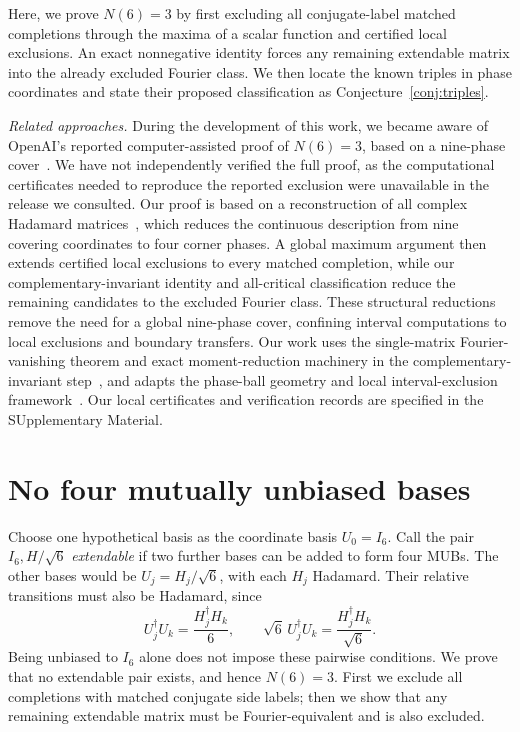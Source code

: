 Here, we prove $N(6)=3$ by first excluding all conjugate-label matched completions through the maxima of a scalar function and certified local exclusions. An exact nonnegative identity forces any remaining extendable matrix into the already excluded Fourier class. We then locate the known triples in phase coordinates and state their proposed classification as Conjecture~\ref{conj:triples}. 

\noindent\emph{Related approaches.}
During the development of this work, we became aware of OpenAI's reported computer-assisted proof of $N(6)=3$, based on a nine-phase cover~\cite{OAIMUB2026}. We have not independently verified the full proof, as the computational certificates needed to reproduce the reported exclusion were unavailable in the release we consulted. 
Our proof is based on a reconstruction of all complex Hadamard matrices~\cite{wuttig2026completeclassificationcomplexhadamard}, which reduces the continuous description from nine covering coordinates to four corner phases. A global maximum argument then extends certified local exclusions to every matched completion, while our complementary-invariant identity and all-critical classification reduce the remaining candidates to the excluded Fourier class. These structural reductions remove the need for a global nine-phase cover, confining interval computations to local exclusions and boundary transfers. Our work uses the single-matrix Fourier-vanishing theorem and exact moment-reduction machinery in the complementary-invariant step~\cite{OAIFourier2026}, and adapts the phase-ball geometry and local interval-exclusion framework~\cite{OAIMUB2026}.  Our local certificates and verification records are specified in the SUpplementary Material.

\section{No four mutually unbiased bases}
\label{sec:nofour}
Choose one hypothetical basis as the coordinate basis $U_0=I_6$. Call the pair $I_6,H/\sqrt6$ \emph{extendable} if two further bases can be added to form four MUBs. The other bases would be $U_j=H_j/\sqrt6$, with each $H_j$ Hadamard. Their relative transitions must also be Hadamard, since
\[
 U_j^\dagger U_k=\frac{H_j^\dagger H_k}{6},\qquad
 \sqrt6\,U_j^\dagger U_k=\frac{H_j^\dagger H_k}{\sqrt6}.
\]
Being unbiased to $I_6$ alone does not impose these pairwise conditions. We prove that no extendable pair exists, and hence $N(6)=3$. First we exclude all completions with matched conjugate side labels; then we show that any remaining extendable matrix must be Fourier-equivalent and is also excluded.

